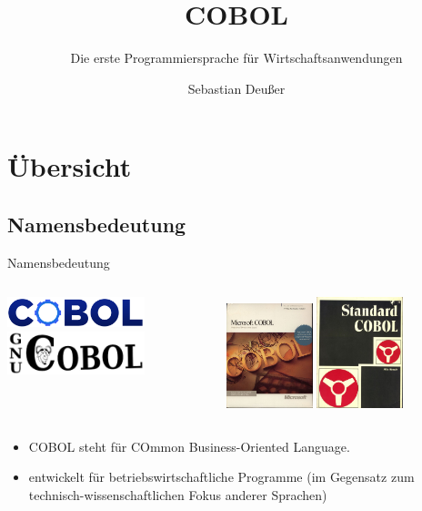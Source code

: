 \documentclass[handout]{beamer}
\title[COBOL-\"Uberblick]   %
{COBOL}
\subtitle
{Die erste Programmiersprache für Wirtschaftsanwendungen} %
\author %
{Sebastian Deußer}
\begin{document}
\begin{frame}
  \titlepage
\end{frame}


\section{Übersicht}
\subsection{Namensbedeutung}
\begin{frame}{Namensbedeutung}
	\begin{columns}[c]%
		\begin{column}{4cm}
			\includegraphics[width=4cm]{CobolCogLogo}\\ 
			\includegraphics[width=4cm]{GnuCOBOLLogoTransparent}
		\end{column}
		\begin{column}{6cm}
			\includegraphics[width=2.5cm]{DOSMSCOBOL45} \hspace{1.5pt}
			\includegraphics[width=2.5cm]{StandardCobol}
		\end{column}
	\end{columns}
	\pause
	\begin{itemize}[<+->]%
		\item
			COBOL steht für COmmon Business-Oriented Language.
		\item
			entwickelt für betriebswirtschaftliche Programme (im Gegensatz zum technisch-wissenschaftlichen Fokus anderer Sprachen)
	\end{itemize}
\end{frame}
\end{document}
